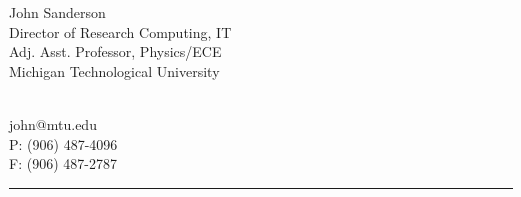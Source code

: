 \begin{minipage}[t]{4.75in}
  \textsf{\large John Sanderson}\\
  Director of Research Computing, IT\\
  Adj. Asst. Professor, Physics/ECE\\
  Michigan Technological University\\
\end{minipage}
\begin{minipage}[t]{1.70in}
  \begin{flushright}
    \hspace*{0.01in}\\
    john@mtu.edu\\
    P: (906) 487-4096\\
    F: (906) 487-2787\\
  \end{flushright}
\end{minipage}
\hrule
